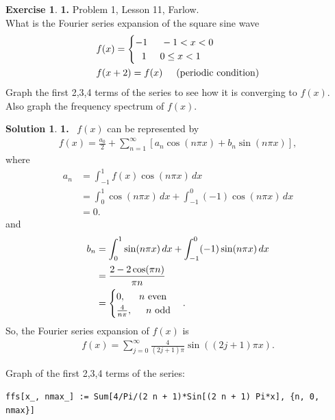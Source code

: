 \documentclass{book}
\theoremstyle{definition}
\newtheorem*{exer*}{Exercise}
\newtheorem*{sln*}{Solution}
\newcommand{\f}[2]{\frac{#1}{#2}}
\newcommand{\lp}{\left(}
\newcommand{\rp}{\right)}
\newcommand{\lb}{\left[}
\newcommand{\rb}{\right]}
\begin{document}
\begin{exer*}\textbf{1.} Problem 1, Lesson 11, Farlow.\\
	
	What is the Fourier series expansion of the square sine wave
	\begin{align*}
	&f(x) = \begin{cases}
	-1 \hspace{0.5cm} -1 < x < 0\\
	\,\,\,\,1 \hspace{0.5cm} 0 \leq x < 1
	\end{cases}\\
	&f(x+2) = f(x) \hspace{0.5cm}\text{(periodic condition)}
	\end{align*} 
	Graph the first 2,3,4 terms of the series to see how it is converging to $f(x)$. Also graph the frequency spectrum of $f(x)$.
	
	\begin{sln*}\textbf{1.}
		$\,$
		$f(x)$ can be represented by
		\begin{align*}
		f(x) = \f{a_0}{2} + \sum^\infty_{n=1}\lb  a_n\cos(n\pi x) + b_n\sin(n\pi x)  \rb,
		\end{align*}
		where
		\begin{align*}
		a_n &= \int^1_{-1}f(x)\cos(n\pi x)\,dx\\
		&= \int^1_0 \cos(n\pi x)\,dx + \int^0_{-1}(-1)\cos(n\pi x)\,dx \\
		&= 0.
		\end{align*}
		and
		\begin{align*}
		b_n &= \int^1_0 \sin(n\pi x)\,dx + \int^0_{-1}(-1)\sin(n\pi x)\,dx\\
		&= \frac{2-2 \cos (\pi  n)}{\pi  n}\\
		&= \begin{cases}
		0, \hspace{0.5cm} n \text{ even}\\
		\f{4}{n\pi }, \hspace{0.5cm} n \text{ odd}
		\end{cases}.
		\end{align*}
		So, the Fourier series expansion of $f(x)$ is
		\begin{align*}
		f(x) = \sum^\infty_{j=0}\f{4}{(2j+1)\pi} \sin\lp (2j+1)\pi x \rp.
		\end{align*}
		
		Graph of the first 2,3,4 terms of the series:
		\begin{lstlisting}
ffs[x_, nmax_] := Sum[4/Pi/(2 n + 1)*Sin[(2 n + 1) Pi*x], {n, 0, nmax}]


\end{lstlisting}
\end{sln*}
\end{exer*}
\end{document}
